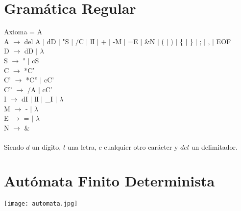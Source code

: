 \documentclass{article}
\begin{document}
\section{Gramática Regular}
\noindent
Axioma = A\\
A $\rightarrow$ del A $|$ dD $|$ "S $|$ /C $|$ lI $|$ + $|$ -M $|$ =E $|$ \&N $|$ ( $|$ ) $|$ \{ $|$ \} $|$ ; $|$ , $|$ EOF\\
D $\rightarrow$ dD $|$ $\lambda$\\
S $\rightarrow$ " $|$ cS\\
C $\rightarrow$ *C'\\
C' $\rightarrow$ *C'' $|$ cC'\\
C'' $\rightarrow$ /A $|$ cC'\\
I $\rightarrow$ dI $|$ lI $|$ \_I $|$ $\lambda$\\
M $\rightarrow$ - $|$ $\lambda$\\
E $\rightarrow$ = $|$ $\lambda$\\
N $\rightarrow$ \&\\
\\
Siendo $d$ un dígito, $l$ una letra, $c$ cualquier otro carácter y $del$ un delimitador.
\section{Autómata Finito Determinista}
\begin{center}
\texttt{[image: automata.jpg]}
\end{center}
\end{document}
